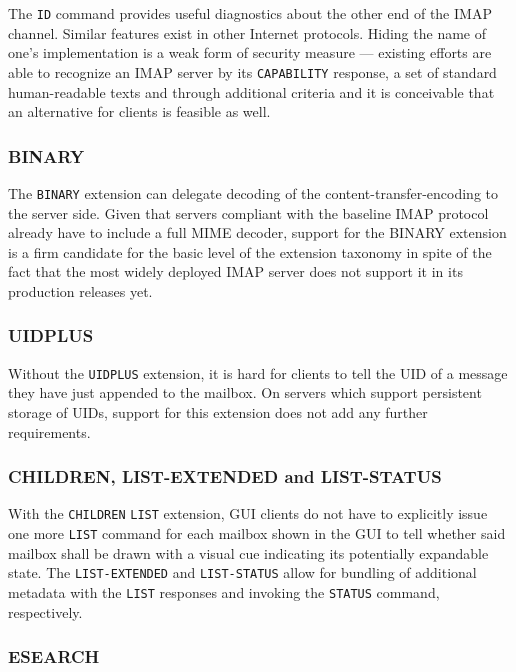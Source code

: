 \documentclass[trojita]{subfiles}
\begin{document}
The {\tt ID} command provides useful diagnostics about the other end of the IMAP channel.  Similar features exist in
other Internet protocols.  Hiding the name of one's implementation is a weak form of security measure --- existing
efforts \cite{openemailsurvey} are able to recognize an IMAP server by its {\tt CAPABILITY} response, a set of standard
human-readable texts and through additional criteria and it is conceivable that an alternative for clients is feasible
as well.

\subsubsection{BINARY}

The {\tt BINARY} extension can delegate decoding of the content-transfer-encoding to the server side.  Given that
servers compliant with the baseline IMAP protocol already have to include a full MIME decoder, support for the BINARY
extension is a firm candidate for the basic level of the extension taxonomy in spite of the fact that the most widely
deployed IMAP server does not support it in its production releases yet.

\subsubsection{UIDPLUS}

Without the {\tt UIDPLUS} extension, it is hard for clients to tell the UID of a message they have just appended to the
mailbox.  On servers which support persistent storage of UIDs, support for this extension does not add any further
requirements.

\subsubsection{CHILDREN, LIST-EXTENDED and LIST-STATUS}

With the {\tt CHILDREN} {\tt LIST} extension, GUI clients do not have to explicitly issue one more {\tt LIST} command
for each mailbox shown in the GUI to tell whether said mailbox shall be drawn with a visual cue indicating its
potentially expandable state.  The {\tt LIST-EXTENDED} and {\tt LIST-STATUS} allow for bundling of additional metadata
with the {\tt LIST} responses and invoking the {\tt STATUS} command, respectively.

\subsubsection{ESEARCH}
\end{document}
